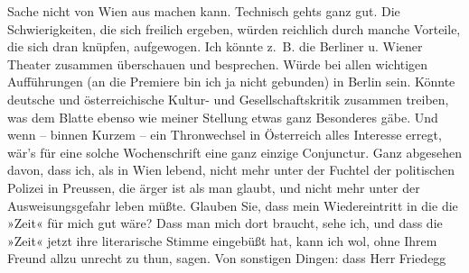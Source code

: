 \begin{ledgroupsized}[t]{13cm}
               Sache nicht von Wien aus machen kann. Technisch
               gehts ganz gut. Die Schwierigkeiten, die sich freilich ergeben, würden reichlich
               durch manche Vorteile, {\pb}die
               sich dran knüpfen, aufgewogen. Ich könnte z. B. die Berliner u. Wiener Theater zusammen
               überschauen und besprechen. Würde bei allen wichtigen Aufführungen (an die Premiere
               bin ich ja nicht gebunden) in Berlin sein. Könnte
                  deutsche und österreichische Kultur- und
               Gesellschaftskritik zusammen treiben, was dem Blatte ebenso wie meiner Stellung etwas ganz Besonderes gäbe. Und wenn – binnen Kurzem
               – ein Thronwechsel in Österreich alles
               Interesse erregt, wär’s für eine solche Wochenschrift eine ganz einzige Conjunctur.
               Ganz abgesehen davon, dass ich, als in Wien
               lebend, nicht mehr unter der Fuchtel der politischen Polizei in Preussen, die ärger ist als man glaubt, und nicht mehr unter
               der Ausweisungsgefahr leben müßte.\pend
           \pstart
           Glauben Sie, dass mein Wiedereintritt in die die »Zeit« für mich gut wäre? Dass man mich dort braucht, sehe ich, und dass die
                  »Zeit« jetzt ihre literarische Stimme
               eingebüßt hat, kann ich wol, ohne Ihrem Freund \label{K_L03430-5v}\label{K_L03430-5h} allzu unrecht zu thun, sagen.\pend
           \pstart
           Von sonstigen Dingen: dass Herr Friedegg

\end{ledgroupsized}
